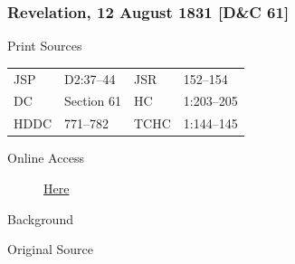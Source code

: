 {		%
		\subsubsection{Revelation, 12 August 1831 [D\&C 61]}
			\label{EMS-1831-JS-12-AUG-1831}
		
			\begin{description}
				\item[Print Sources]
			\end{description}

				\begin{tabular}{p{0.5in}p{1in}p{0.5in}p{1in}}
				JSP	 	& D2:37--44		& JSR 		& 152--154 \\
				DC	 	& Section 61 	& HC 		& 1:203--205 \\
				HDDC 	& 771--782		& TCHC 		& 1:144--145 \\
				\end{tabular}
			
			\begin{description}
				\item[Online Access] \href{https://www.josephsmithpapers.org/paper-summary/revelation-12-august-1831-dc-61/1}{Here}
			\end{description}
			
			\begin{description}
				\item[Background]
			\end{description}
			
			
			\begin{description}
				\item[Original Source]
			\end{description}
			
			
}
